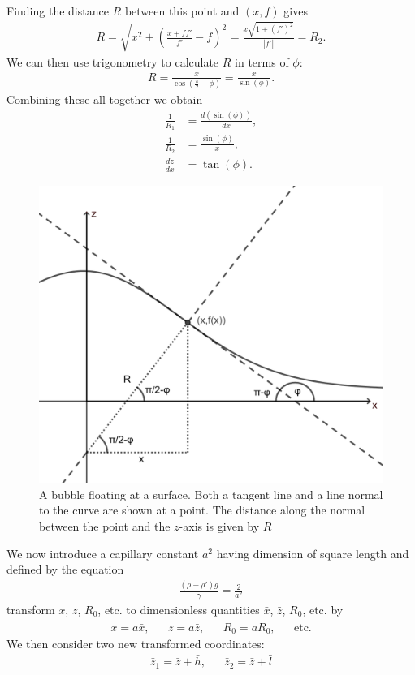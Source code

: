 Finding the distance $R$ between this point and $(x,f)$ gives
\begin{align}
    R=\sqrt{x^2+(\frac{x+ff'}{f'}-f)^2}=\frac{x\sqrt{1+(f')^2}}{|f'|}=R_2.
\end{align}
We can then use trigonometry to calculate $R$ in terms of $\phi$:
\begin{align}
    R=\frac{x}{\cos(\frac{\pi}{2}-\phi)}=\frac{x}{\sin(\phi)}.
\end{align}
Combining these all together we obtain
\begin{align}
    \frac{1}{R_1}&=\frac{d(\sin(\phi))}{dx},\\
    \frac{1}{R_2}&=\frac{\sin(\phi)}{x},\\
    \frac{dz}{dx} &= \tan(\phi).
\end{align}
\begin{figure}
    \centering
    \includegraphics[width=0.6\linewidth]{WriteUp/images/angles and trig.png}
    \caption{A bubble floating at a surface. Both a tangent line and a line normal to the curve are shown at a point. The distance along the normal between the point and the $z$-axis is given by $R$}
    \label{fig:4}
\end{figure}
We now introduce a capillary constant $a^2$ having dimension of square length and defined by the equation
\begin{align}
    \frac{(\rho-\rho')g}{\gamma} = \frac{2}{a^2}
\end{align}
transform $x$, $z$, $R_0$, etc. to dimensionless quantities $\bar{x}$, $\bar{z}$, $\bar{R_0}$, etc. by
\begin{align}
    x=a\bar{x}, && z=a\bar{z}, && R_0=a\bar{R}_0, && \text{etc.}
\end{align}
We then consider two new transformed coordinates:
\begin{align}
    \bar{z}_1 = \bar{z}+\bar{h}, && \bar{z}_2=\bar{z}+\bar{l}
\end{align}
